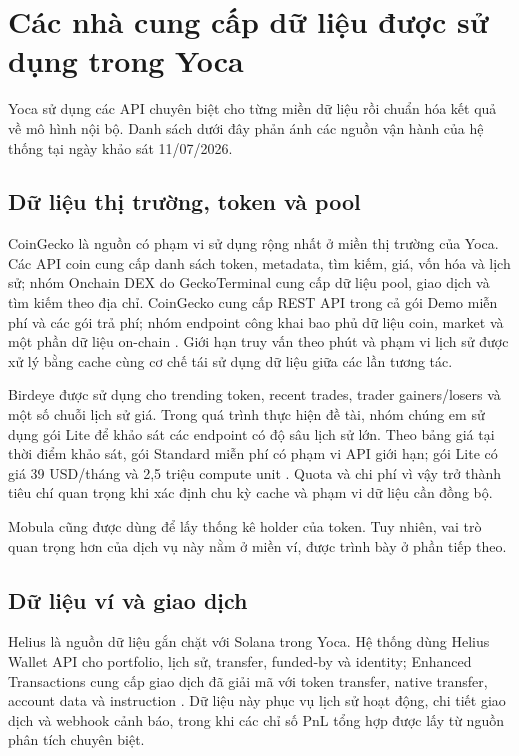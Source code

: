 \section{Các nhà cung cấp dữ liệu được sử dụng trong Yoca}
\label{sec:data_providers}

Yoca sử dụng các API chuyên biệt cho từng miền dữ liệu rồi chuẩn hóa kết quả về mô hình nội bộ. Danh sách dưới đây phản ánh các nguồn vận hành của hệ thống tại ngày khảo sát 11/07/2026.

\subsection{Dữ liệu thị trường, token và pool}

CoinGecko là nguồn có phạm vi sử dụng rộng nhất ở miền thị trường của Yoca. Các API coin cung cấp danh sách token, metadata, tìm kiếm, giá, vốn hóa và lịch sử; nhóm Onchain DEX do GeckoTerminal cung cấp dữ liệu pool, giao dịch và tìm kiếm theo địa chỉ. CoinGecko cung cấp REST API trong cả gói Demo miễn phí và các gói trả phí; nhóm endpoint công khai bao phủ dữ liệu coin, market và một phần dữ liệu on-chain \cite{coingecko-api-docs}. Giới hạn truy vấn theo phút và phạm vi lịch sử được xử lý bằng cache cùng cơ chế tái sử dụng dữ liệu giữa các lần tương tác.

Birdeye được sử dụng cho trending token, recent trades, trader gainers/losers và một số chuỗi lịch sử giá. Trong quá trình thực hiện đề tài, nhóm chúng em sử dụng gói Lite để khảo sát các endpoint có độ sâu lịch sử lớn. Theo bảng giá tại thời điểm khảo sát, gói Standard miễn phí có phạm vi API giới hạn; gói Lite có giá 39 USD/tháng và 2,5 triệu compute unit \cite{birdeye-pricing}. Quota và chi phí vì vậy trở thành tiêu chí quan trọng khi xác định chu kỳ cache và phạm vi dữ liệu cần đồng bộ.

Mobula cũng được dùng để lấy thống kê holder của token. Tuy nhiên, vai trò quan trọng hơn của dịch vụ này nằm ở miền ví, được trình bày ở phần tiếp theo.

\subsection{Dữ liệu ví và giao dịch}

Helius là nguồn dữ liệu gắn chặt với Solana trong Yoca. Hệ thống dùng Helius Wallet API cho portfolio, lịch sử, transfer, funded-by và identity; Enhanced Transactions cung cấp giao dịch đã giải mã với token transfer, native transfer, account data và instruction \cite{helius-enhanced-transactions}. Dữ liệu này phục vụ lịch sử hoạt động, chi tiết giao dịch và webhook cảnh báo, trong khi các chỉ số PnL tổng hợp được lấy từ nguồn phân tích chuyên biệt.

